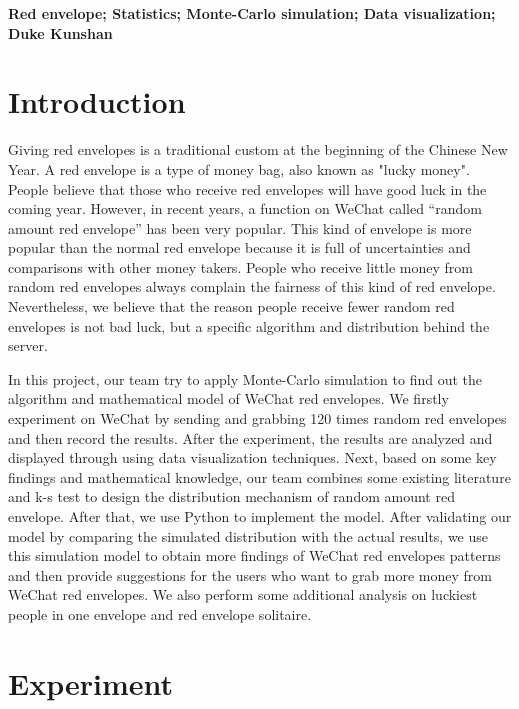 \documentclass{scrartcl}
\begin{document}
\begin{keywords}
\centering
        \textbf{Red envelope; Statistics; Monte-Carlo simulation; Data visualization; Duke Kunshan}
\end{keywords}

\newpage



\doublespacing
\tableofcontents
\singlespacing

\newpage

\doublespacing

\section{Introduction}
\label{sec1}
Giving red envelopes is a traditional custom at the beginning of the Chinese New Year. A red envelope is a type of money bag, also known as "lucky money". People believe that those who receive red envelopes will have good luck in the coming year.
However, in recent years, a  function on WeChat called “random amount red envelope” has been very popular. This kind of envelope is more popular than the normal red envelope because it is full of uncertainties and comparisons with other money takers. People who receive little money from random red envelopes always complain the fairness of this kind of red envelope. Nevertheless, we believe that the reason people receive fewer random red envelopes is not bad luck, but a specific algorithm and distribution behind the server.

In this project, our team try to apply Monte-Carlo simulation to find out the algorithm and mathematical model of WeChat red envelopes. We  firstly experiment on WeChat by sending and grabbing 120 times random red envelopes and then record the results. After the experiment, the results are analyzed and displayed through using data visualization techniques. Next, based on some key findings and mathematical knowledge, our team combines some existing literature and k-s test to design the distribution mechanism of random amount red envelope. After that, we use Python to implement the model. After validating our model by comparing the simulated distribution with the actual results, we use this simulation model to obtain more findings of WeChat red envelopes patterns and then provide suggestions for the users who want to grab more money from WeChat red envelopes. We also perform some additional analysis on luckiest people in one envelope and red envelope solitaire.

\section{Experiment}\label{sec2}
\end{document}
